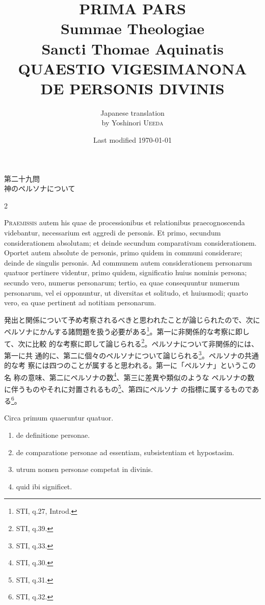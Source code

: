 \documentclass[paper=a4paper,fontsize=10pt,jafontsize=9pt,titlepage]{jlreq}
\title{{\bfseries PRIMA PARS}\\{\Huge Summae Theologiae}\\Sancti Thomae
Aquinatis\\{\sffamily QUAESTIO VIGESIMANONA}\\DE PERSONIS DIVINIS}
\author{Japanese translation\\by Yoshinori {\scshape Ueeda}}
\date{Last modified \today}
\begin{document}
\maketitle

\begin{center}
{\Large 第二十九問\\神のペルソナについて}
\end{center}




\newpage
\begin{paracol}{2}

{\Huge P}{\scshape raemissis} autem his quae de processionibus et relationibus
 praecognoscenda videbantur, necessarium est aggredi de personis. Et
 primo, secundum considerationem absolutam; et deinde secundum
 comparativam considerationem. Oportet autem absolute de personis, primo
 quidem in communi considerare; deinde de singulis personis. Ad communem
 autem considerationem personarum quatuor pertinere videntur, primo
 quidem, significatio huius nominis persona; secundo vero, numerus
 personarum; tertio, ea quae consequuntur numerum personarum, vel ei
 opponuntur, ut diversitas et solitudo, et huiusmodi; quarto vero, ea
 quae pertinent ad notitiam personarum.

\switchcolumn

発出と関係について予め考察されるべきと思われたことが論じられたので、次に
ペルソナにかんする諸問題を扱う必要がある\footnote{STI, q.27, Introd.}。第一に非関係的な考察に即して、次に比較
 的な考察に即して論じられる\footnote{STI, q.39.}。ペルソナについて非関係的には、第一に共
 通的に、第二に個々のペルソナについて論じられる\footnote{STI, q.33.}。ペルソナの共通的な考
 察には四つのことが属すると思われる。第一に「ペルソナ」というこの名
 称の意味、第二にペルソナの数\footnote{STI, q.30.}、第三に差異や類似のような
 ペルソナの数に伴うものやそれに対置されるもの\footnote{STI, q.31.}、第四にペルソナ
 の指標に属するものである\footnote{STI, q.32.}。

\switchcolumn*

Circa primum quaeruntur
 quatuor. 


\begin{enumerate}
 \item de definitione personae.
 \item de comparatione personae ad essentiam, subsistentiam et hypostasim.
 \item utrum nomen personae competat in divinis.
 \item quid ibi significet.
\end{enumerate}


\end{paracol}
\end{document}
